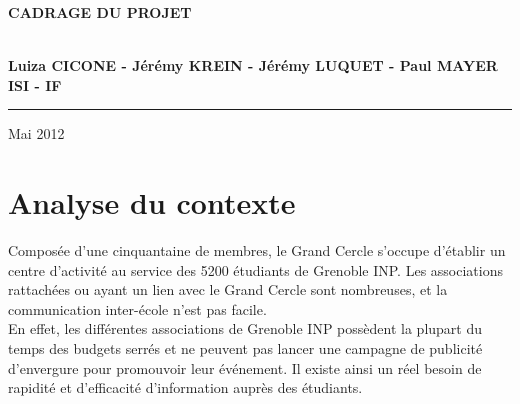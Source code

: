 \documentclass[a4paper,11px]{article}
\begin{document}
\begin{titlepage}
\begin{center}
\begin{center}
{\Huge \bf CADRAGE DU PROJET}


\end{center}


\vspace{1cm}

\begin{center}
$ $\\
\large{ \textbf{Luiza CICONE - Jérémy KREIN - Jérémy LUQUET - Paul MAYER}}\\
\large{ \textbf{ISI - IF}}
$ $\\
\end{center}
\rule{\linewidth}{.5pt}


\vfill


{\large Mai 2012}

\end{center}
\end{titlepage}


\newpage


%
\newenvironment{myenumerate}{%
  \edef\backupindent{\the\parindent}%
  \enumerate%
  \setlength{\parindent}{\backupindent}%
}{\endenumerate}

%

\renewcommand{\appendixtocname}{Annexes}


\vspace*{\fill}
\section{\bf{Analyse du contexte}}
\indent Composée d'une cinquantaine de membres, le Grand Cercle s'occupe d'établir un centre d’activité au service des 5200 étudiants de Grenoble INP. Les associations rattachées ou ayant un lien avec le Grand Cercle sont nombreuses, et la communication inter-école n'est pas facile.\\
En effet, les différentes associations de Grenoble INP possèdent la plupart du temps des budgets serrés et ne peuvent pas lancer une campagne de publicité d'envergure pour promouvoir leur événement. Il existe ainsi un réel besoin de rapidité et d'efficacité d'information auprès des étudiants.
\end{document}
